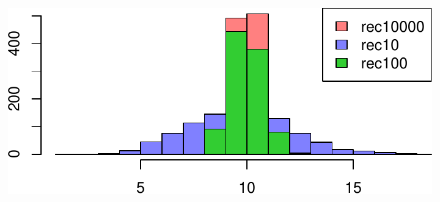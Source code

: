 \documentclass[
  letterpaper,
  DIV=11,
  numbers=noendperiod]{scrreprt}
\begin{document}
\begin{figure}[H]

{\centering \includegraphics{6_hyohon_files/figure-pdf/unnamed-chunk-7-1.pdf}

}

\end{figure}
\end{document}
